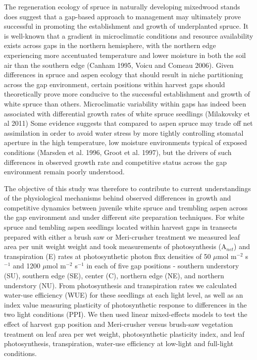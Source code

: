 \documentclass{article}\usepackage[]{graphicx}\usepackage[]{color}
\begin{document}
\begin{multicols}{2}
The regeneration ecology of spruce in naturally developing mixedwood stands does suggest that a gap-based approach to management may ultimately prove successful in promoting the establishment and growth of underplanted spruce. It is well-known that a gradient in microclimatic conditions and resource availability exists across gaps in the northern hemisphere, with the northern edge experiencing more accentuated temperature and lower moisture in both the soil air than the southern edge (Canham 1995, Voicu and Comeau 2006). Given differences in spruce and aspen ecology that should result in niche partitioning across the gap environment, certain positions within harvest gaps should theoretically prove more conducive to the successful establishment and growth of white spruce than others. Microclimatic variability within gaps has indeed been associated with differential growth rates of white spruce seedlings (Milakovsky et al 2011) Some evidence suggests that compared to aspen spruce may trade off net assimilation in order to avoid water stress by more tightly controlling stomatal aperture in the high temperature, low moisture environments typical of exposed conditions (Marsden et al. 1996, Groot et al. 1997), but the drivers of such differences in observed growth rate and competitive status across the gap environment remain poorly understood. 

The objective of this study was therefore to contribute to current understandings of the physiological mechanisms behind observed differences in growth and competitive dynamics between juvenile white spruce and trembling aspen across the gap environment and under different site preparation techniques. For white spruce and tembling aspen seedlings located within harvest gaps in transects prepared with either a brush saw or Meri-crusher treatment we measured leaf area per unit weight weight and took measurements of photosynthesis (A$_{net}$) and transpiration (E) rates at photosynthetic photon flux densities of 50 $\mu$mol m$^{-2}$ s$^{-1}$ and 1200 $\mu$mol m$^{-2}$ s$^{-1}$ in each of five gap positions - southern understory (SU), southern edge (SE), center (C), northern edge (NE), and northern understory (NU). From photosynthesis and transpiration rates we calculated water-use efficiency (WUE) for these seedlings at each light level, as well as an index value measuring plasticity of photosynthetic response to differences in the two light conditions (PPI). We then used linear mixed-effects models to test the effect of harvest gap position and Meri-crusher versus brush-saw vegetation treatment on leaf area per wet weight, photosynthetic plasticity index, and leaf photosynthesis, transpiration, water-use efficiency at low-light and full-light conditions.


\end{multicols}
\end{document}
